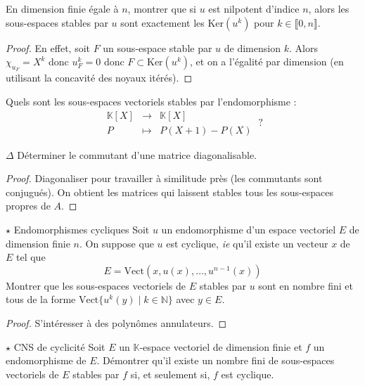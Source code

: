 \documentclass[french,a4paper]{article}
\newcommand{\N}{\mathbb{N}}
\newcommand{\K}{\mathbb{K}}
\renewcommand{\ker}{\text{Ker}}
\theoremstyle{plain}
\theoremstyle{definition}
\theoremstyle{remark}
\begin{document}
\begin{ex}{}
	En dimension finie égale à $n$, montrer que si $u$ est nilpotent d’indice $n$, alors les sous-espaces stables par $u$ sont exactement les $\ker(u^k)$ pour $k\in\llbracket0, n\rrbracket$.
\end{ex}
\begin{proof}
	En effet, soit $F$ un sous-espace stable par $u$ de dimension $k$. Alors $\chi_{u_F}=X^k$ donc $u_F^k=0$ donc $F\subset\ker(u^k)$, et on a l'égalité par dimension (en utilisant la concavité des noyaux itérés).
\end{proof}

\begin{ex}{}
	Quels sont les sous-espaces vectoriels stables par l'endomorphisme : $$\begin{array}{rcl}
		\K[X]&\longrightarrow&\K[X]\\
		P&\longmapsto&P(X+1)-P(X)
	\end{array}\ ?$$
\end{ex}

\begin{ex}{$\Delta$}
	Déterminer le commutant d'une matrice diagonalisable.
\end{ex}
\begin{proof}
	Diagonaliser pour travailler à similitude près (les commutants sont conjugués). On obtient les matrices qui laissent stables tous les sous-espaces propres de $A$.
\end{proof}

\begin{ex}{$\star$ Endomorphismes cycliques}
	Soit $u$ un endomorphisme d'un espace vectoriel $E$ de dimension finie $n$. On suppose que $u$ est cyclique, \textit{ie} qu'il existe un vecteur $x$ de $E$ tel que $$E=\text{Vect}(x,u(x),\ldots,u^{n-1}(x))$$ Montrer que les sous-espaces vectoriels de $E$ stables par $u$ sont en nombre fini et tous de la forme $\text{Vect}\{u^k(y)\mid k\in\N\}$ avec $y\in E$.
\end{ex}
\begin{proof}
	S'intéresser à des polynômes annulateurs.
\end{proof}

\begin{ex}[Châteaux]{$\star$ CNS de cyclicité}
	Soit $E$ un $\K$-espace vectoriel de dimension finie et $f$ un endomorphisme de $E$. Démontrer qu'il existe un nombre fini de sous-espaces vectoriels de $E$ stables par $f$ si, et seulement si, $f$ est cyclique.
\end{ex}
\end{document}
